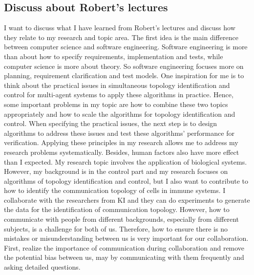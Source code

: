 \documentclass[11pt]{article}
\begin{document}
\subsection*{Discuss about Robert’s lectures}
I want to discuss what I have learned from Robert’s lectures and discuss how they relate to my research and topic area. The first idea is the main difference between computer science and software engineering. Software engineering is more than about how to specify requirements, implementation and tests, while computer science is more about theory. So software engineering focuses more on planning, requirement clarification and test models. One inspiration for me is to think about the practical issues in simultaneous topology identification and control for multi-agent systems to apply these algorithms in practice. Hence, some important problems in my topic are how to combine these two topics appropriately and how to scale the algorithms for topology identification and control. When specifying the practical issues, the next step is to design algorithms to address these issues and test these algorithms’ performance for verification. Applying these principles in my research allows me to address my research problems systematically. Besides, human factors also have more effect than I expected. My research topic involves the application of biological systems. However, my background is in the control part and my research focuses on algorithms of topology identification and control, but I also want to contribute to how to identify the communication topology of cells in immune systems. I collaborate with the researchers from KI and they can do experiments to generate the data for the identification of communication topology. However, how to communicate with people from different backgrounds, especially from different subjects, is a challenge for both of us. Therefore, how to ensure there is no mistakes or misunderstanding between us is very important for our collaboration. First, realize the importance of communication during collaboration and remove the potential bias between us, may by communicating with them frequently and asking detailed questions.
\\
\end{document}
